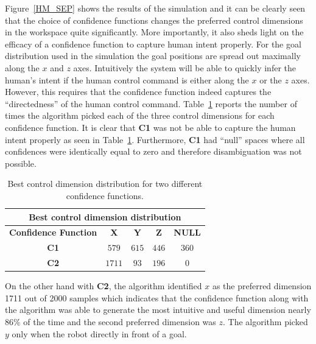 \documentclass[conference]{IEEEtran}
\begin{document}
Figure~\ref{HM_SEP} shows the results of the simulation and it can be clearly seen that the choice of confidence functions changes the preferred control dimensions in the workspace quite significantly. More importantly, it also sheds light on the efficacy of a confidence function to capture human intent properly. For the goal distribution used in the simulation the goal positions are spread out maximally along the $x$ and $z$ axes. Intuitively the system will be able to quickly infer the human's intent if the human control command is either along the $x$ or the $z$ axes. However, this requires that the confidence function indeed captures the ``directedness'' of the human control command. 
Table~\ref{HMD} reports the number of times the algorithm picked each of the three control dimensions for each confidence function.  
It is clear that \textbf{C1} was not be able to capture the human intent properly as seen in Table~\ref{HMD}. Furthermore, \textbf{C1} had ``null'' spaces where all confidences were identically equal to zero and therefore disambiguation was not possible.  
\begin{table}[h]
	\centering
	\begin{tabular}{|c|c|c|c|c|}
		\hline
		\multicolumn{5}{|c|}{Best control dimension distribution} \\
		\hline
		\textbf{Confidence Function} & \textbf{X} & \textbf{Y} & \textbf{Z} & \textbf{NULL} \\ \hline
		
		\textbf{C1} & $579$ & $615$ & $446$ & $360$ \\ \hline
		\textbf{C2} & $1711$ & $93$ & $196$ & $0$\\ \hline
		
	\end{tabular}
	\vspace{.2cm}
	\caption{Best control dimension distribution for two different confidence functions.} 
	\label{HMD}
	\vspace{-.5cm}
\end{table}
On the other hand with \textbf{C2}, the algorithm identified $x$ as the preferred dimension 1711 out of 2000 samples which indicates that the confidence function along with the algorithm was able to generate the most intuitive and useful dimension nearly $86\%$ of the time and the second preferred dimension was $z$. The algorithm picked $y$ only when the robot directly in front of a goal. 
\end{document}
